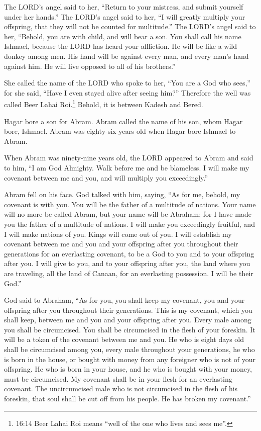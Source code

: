 \myverse{}The LORD’s angel said to her, “Return to your mistress, and submit yourself under her hands.” \myverse{}The LORD’s angel said to her, “I will greatly multiply your offspring, that they will not be counted for multitude.” \myverse{}The LORD’s angel said to her, “Behold, you are with child, and will bear a son. You shall call his name Ishmael, because the LORD has heard your affliction. \myverse{}He will be like a wild donkey among men. His hand will be against every man, and every man’s hand against him. He will live opposed to all of his brothers.”

\myverse{}She called the name of the LORD who spoke to her, “You are a God who sees,” for she said, “Have I even stayed alive after seeing him?” \myverse{}Therefore the well was called Beer Lahai Roi.\footnote{16:14 Beer Lahai Roi means “well of the one who lives and sees me”.} Behold, it is between Kadesh and Bered.

\myverse{}Hagar bore a son for Abram. Abram called the name of his son, whom Hagar bore, Ishmael. \myverse{}Abram was eighty-six years old when Hagar bore Ishmael to Abram.

\mychapter{}
\myverse*{}When Abram was ninety-nine years old, the LORD appeared to Abram and said to him, “I am God Almighty. Walk before me and be blameless. \myverse{}I will make my covenant between me and you, and will multiply you exceedingly.”

\myverse{}Abram fell on his face. God talked with him, saying, \myverse{}“As for me, behold, my covenant is with you. You will be the father of a multitude of nations. \myverse{}Your name will no more be called Abram, but your name will be Abraham; for I have made you the father of a multitude of nations. \myverse{}I will make you exceedingly fruitful, and I will make nations of you. Kings will come out of you. \myverse{}I will establish my covenant between me and you and your offspring after you throughout their generations for an everlasting covenant, to be a God to you and to your offspring after you. \myverse{}I will give to you, and to your offspring after you, the land where you are traveling, all the land of Canaan, for an everlasting possession. I will be their God.”

\myverse{}God said to Abraham, “As for you, you shall keep my covenant, you and your offspring after you throughout their generations. \myverse{}This is my covenant, which you shall keep, between me and you and your offspring after you. Every male among you shall be circumcised. \myverse{}You shall be circumcised in the flesh of your foreskin. It will be a token of the covenant between me and you. \myverse{}He who is eight days old shall be circumcised among you, every male throughout your generations, he who is born in the house, or bought with money from any foreigner who is not of your offspring. \myverse{}He who is born in your house, and he who is bought with your money, must be circumcised. My covenant shall be in your flesh for an everlasting covenant. \myverse{}The uncircumcised male who is not circumcised in the flesh of his foreskin, that soul shall be cut off from his people. He has broken my covenant.”


